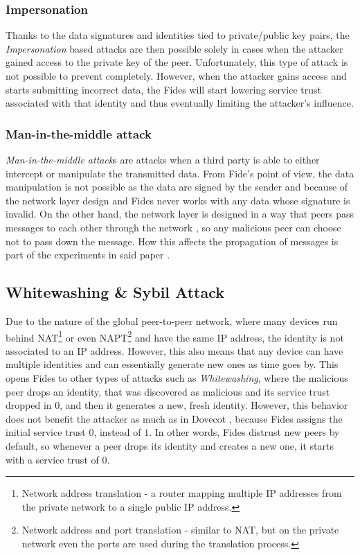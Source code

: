 \subsubsection{Impersonation}
Thanks to the data signatures and identities tied to private/public key pairs, the \textit{Impersonation} based attacks are then possible solely in cases when the attacker gained access to the private key of the peer.
Unfortunately, this type of attack is not possible to prevent completely. 
However, when the attacker gains access and starts submitting incorrect data, the Fides will start lowering service trust associated with that identity and thus eventually limiting the attacker's influence.

\subsubsection{Man-in-the-middle attack}
\textit{Man-in-the-middle attack}s are attacks when a third party is able to either intercept or manipulate the transmitted data.
From Fide's point of view, the data manipulation is not possible as the data are signed by the sender and because of the network layer \cite{nl} design and Fides never works with any data whose signature is invalid.
On the other hand, the network layer is designed in a way that peers pass messages to each other through the network \cite{nl}, so any malicious peer can choose not to pass down the message.
How this affects the propagation of messages is part of the experiments in said paper \cite{nl}.

\subsection{Whitewashing \& Sybil Attack}
\label{subsec:whitewashing-and-sybil-attack}
Due to the nature of the global peer-to-peer network, where many devices run behind NAT\footnote{Network address translation - a router mapping multiple IP addresses from the private network to a single public IP address.} or even NAPT\footnote{Network address and port translation - similar to NAT, but on the private network even the ports are used during the translation process.} and have the same IP address, the identity is not associated to an IP address.
However, this also means that any device can have multiple identities and can essentially generate new ones as time goes by.
This opens Fides to other types of attacks such as \textit{Whitewashing}, where the malicious peer drops an identity, that was discovered as malicious and its service trust dropped in $0$, and then it generates a new, fresh identity.
However, this behavior does not benefit the attacker as much as in Dovecot \cite{dita}, because Fides assigns the initial service trust $0$, instead of $1$.
In other words, Fides distrust new peers by default, so whenever a peer drops its identity and creates a new one, it starts with a service trust of $0$.


